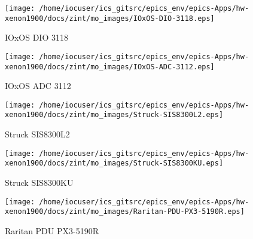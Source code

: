 \noindent
\vspace{1.4cm}
\begin{minipage}{.2\textwidth}
\begin{center}
\texttt{[image: /home/iocuser/ics\_gitsrc/epics\_env/epics-Apps/hw-xenon1900/docs/zint/mo\_images/IOxOS-DIO-3118.eps]}
\end{center}
\end{minipage}
\begin{minipage}{.7\textwidth}
IOxOS DIO 3118
\end{minipage}


\noindent
\vspace{1.4cm}
\begin{minipage}{.2\textwidth}
\begin{center}
\texttt{[image: /home/iocuser/ics\_gitsrc/epics\_env/epics-Apps/hw-xenon1900/docs/zint/mo\_images/IOxOS-ADC-3112.eps]}
\end{center}
\end{minipage}
\begin{minipage}{.7\textwidth}
IOxOS ADC 3112
\end{minipage}


\noindent
\vspace{1.4cm}
\begin{minipage}{.2\textwidth}
\begin{center}
\texttt{[image: /home/iocuser/ics\_gitsrc/epics\_env/epics-Apps/hw-xenon1900/docs/zint/mo\_images/Struck-SIS8300L2.eps]}
\end{center}
\end{minipage}
\begin{minipage}{.7\textwidth}
Struck SIS8300L2
\end{minipage}


\noindent
\vspace{1.4cm}
\begin{minipage}{.2\textwidth}
\begin{center}
\texttt{[image: /home/iocuser/ics\_gitsrc/epics\_env/epics-Apps/hw-xenon1900/docs/zint/mo\_images/Struck-SIS8300KU.eps]}
\end{center}
\end{minipage}
\begin{minipage}{.7\textwidth}
Struck SIS8300KU
\end{minipage}


\noindent
\vspace{1.4cm}
\begin{minipage}{.2\textwidth}
\begin{center}
\texttt{[image: /home/iocuser/ics\_gitsrc/epics\_env/epics-Apps/hw-xenon1900/docs/zint/mo\_images/Raritan-PDU-PX3-5190R.eps]}
\end{center}
\end{minipage}
\begin{minipage}{.7\textwidth}
Raritan PDU PX3-5190R
\end{minipage}



